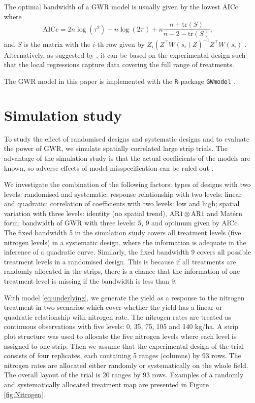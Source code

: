\documentclass[a4paper]{article} 	%
\newcommand{\tr}{\mathrm{tr}}
\newcommand{\R}{\texttt{R}}
\newcommand{\Matern}{Mat\'ern }
\newcommand{\AR}{\mathrm{AR1}}
\begin{document}
The optimal bandwidth of a GWR model is usually given by the lowest AICc where 
\begin{equation}\label{eq:aicc}
	\mbox{AICc} = 2n\log (\tau^2) + n \log (2\pi) + n\frac{ n+\tr (S) }{n-2-\tr (S)},
\end{equation}
and $S$ is the matrix with the $i$-th row given by $Z_i\left( Z^\top W(s_i) Z \right)^{-1}Z^\top W(s_i)$ \parencite{Evans2020Assessment}. Alternatively, as suggested by \textcite{Rakshit2020Novel}, it can be based on the experimental design such that the local regressions capture data covering the full range of treatments.

The GWR model in this paper is implemented with the \R-package \texttt{GWmodel} \parencite{lu2014gwmodel, Gollini2015GWmodel}. 


\section{Simulation study}\label{Sec:Simu}

To study the effect of randomised designs and systematic designs and to evaluate the power of GWR, we simulate spatially correlated large strip trials. The advantage of the simulation study is that the actual coefficients of the models are known, so adverse effects of model misspecification
can be ruled out \parencite{Piepho2013Why}. 

We investigate the combination of the following factors: types of designs with two levels: randomised and systematic; response relationship with two levels: linear and quadratic; correlation of coefficients with two levels: low and high; spatial variation with three levels: identity (no spatial trend), $\AR\otimes\AR$ and \Matern form; bandwidth of GWR with three levels: 5, 9 and optimum given by AICc. The fixed bandwidth 5 in the simulation study covers all treatment levels (five nitrogen levels) in a systematic design, where the information is adequate in the inference of a quadratic curve. Similarly, the fixed bandwidth 9 covers all possible treatment levels in a randomised design. This is because if all treatments are randomly allocated in the strips, there is a chance that the information of one treatment level is missing if the bandwidth is less than 9. 

With model \eqref{eq:underlying}, we generate the yield as a response to the nitrogen treatment in two scenarios which cover whether the yield has a linear or quadratic relationship with nitrogen rate. The nitrogen rates are treated as continuous observations with five levels: 0, 35, 75, 105 and 140 kg/ha. A strip plot structure was used to allocate the five nitrogen levels where each level is assigned to one strip. Then we assume that the experimental design of the trial consists of four replicates, each containing 5 ranges (columns) by 93 rows. The nitrogen rates are allocated either randomly or systematically on the whole field. The overall layout of the trial is 20 ranges by 93 rows. Examples of a randomly and systematically allocated treatment map are presented in Figure \ref{fig:Nitrogen}. 
\end{document}
